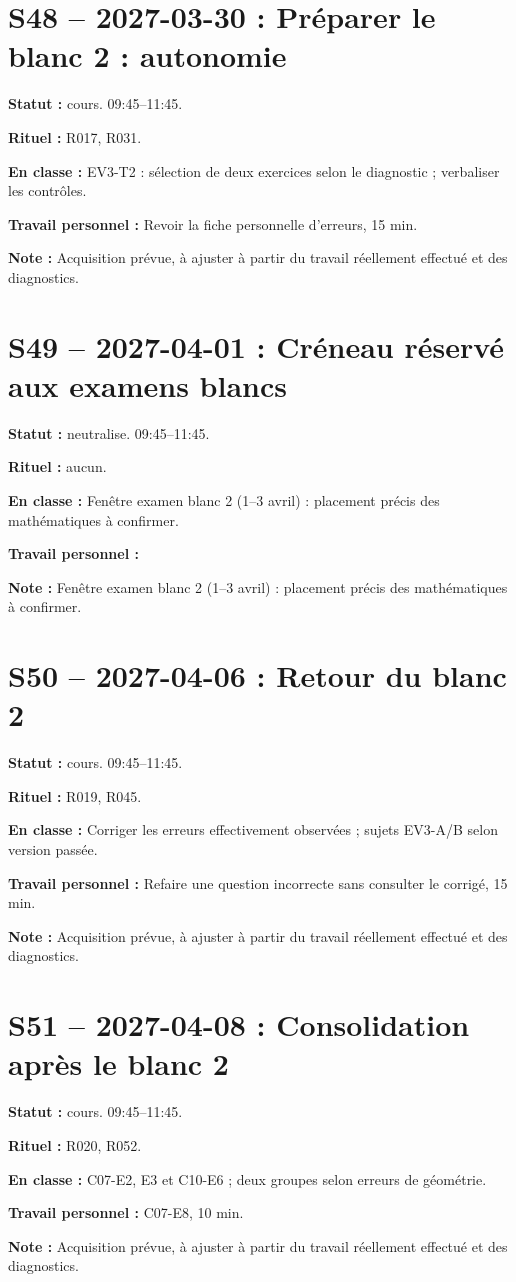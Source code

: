 \section*{S48 -- 2027-03-30 : Préparer le blanc 2 : autonomie}
\textbf{Statut :} cours. 09:45–11:45.\par\textbf{Rituel :} R017, R031.\par\textbf{En classe :} EV3-T2 : sélection de deux exercices selon le diagnostic ; verbaliser les contrôles.\par\textbf{Travail personnel :} Revoir la fiche personnelle d’erreurs, 15 min.\par\textbf{Note :} Acquisition prévue, à ajuster à partir du travail réellement effectué et des diagnostics.
\section*{S49 -- 2027-04-01 : Créneau réservé aux examens blancs}
\textbf{Statut :} neutralise. 09:45–11:45.\par\textbf{Rituel :} aucun.\par\textbf{En classe :} Fenêtre examen blanc 2 (1–3 avril) : placement précis des mathématiques à confirmer.\par\textbf{Travail personnel :} \par\textbf{Note :} Fenêtre examen blanc 2 (1–3 avril) : placement précis des mathématiques à confirmer.
\section*{S50 -- 2027-04-06 : Retour du blanc 2}
\textbf{Statut :} cours. 09:45–11:45.\par\textbf{Rituel :} R019, R045.\par\textbf{En classe :} Corriger les erreurs effectivement observées ; sujets EV3-A/B selon version passée.\par\textbf{Travail personnel :} Refaire une question incorrecte sans consulter le corrigé, 15 min.\par\textbf{Note :} Acquisition prévue, à ajuster à partir du travail réellement effectué et des diagnostics.
\section*{S51 -- 2027-04-08 : Consolidation après le blanc 2}
\textbf{Statut :} cours. 09:45–11:45.\par\textbf{Rituel :} R020, R052.\par\textbf{En classe :} C07-E2, E3 et C10-E6 ; deux groupes selon erreurs de géométrie.\par\textbf{Travail personnel :} C07-E8, 10 min.\par\textbf{Note :} Acquisition prévue, à ajuster à partir du travail réellement effectué et des diagnostics.
